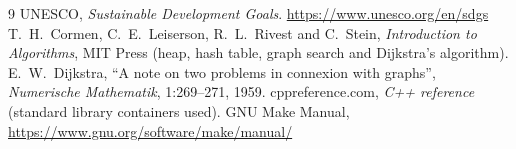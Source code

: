 \documentclass[11pt,a4paper]{article}
\begin{document}
\begin{thebibliography}{9}
 UNESCO, \emph{Sustainable Development Goals}. \url{https://www.unesco.org/en/sdgs}
 T.~H.~Cormen, C.~E.~Leiserson, R.~L.~Rivest and C.~Stein, \emph{Introduction to Algorithms}, MIT Press (heap, hash table, graph search and Dijkstra's algorithm).
 E.~W.~Dijkstra, ``A note on two problems in connexion with graphs'', \emph{Numerische Mathematik}, 1:269--271, 1959.
 cppreference.com, \emph{C++ reference} (standard library containers used).
 GNU Make Manual, \url{https://www.gnu.org/software/make/manual/}
\end{thebibliography}
\end{document}
